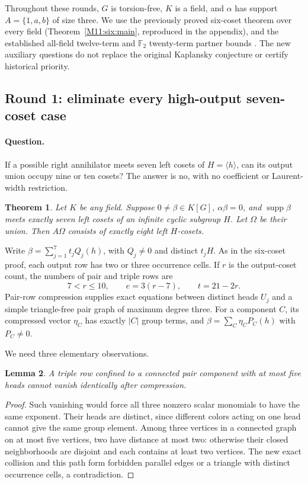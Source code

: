 \documentclass[11pt,a4paper,oneside]{report}
\newtheorem{theorem}{Theorem}[section]
\newtheorem{lemma}[theorem]{Lemma}
\theoremstyle{definition}
\theoremstyle{remark}
\DeclareMathOperator{\supp}{supp}
\begin{document}
Throughout these rounds, $G$ is torsion-free, $K$ is a field, and
$\alpha$ has support $A=\{1,a,b\}$ of size three. We use the previously
proved six-coset theorem over every field
(Theorem~\ref{M11:six:main}, reproduced in the appendix), and the established
all-field twelve-term and $\mathbb F_2$ twenty-term partner bounds
\cite{B:AJ,B:ATsmall}. The new auxiliary questions do not replace the original
Kaplansky conjecture or certify historical priority.

\subsection{Round 1: eliminate every high-output seven-coset case}

\paragraph{Question.}
If a possible right annihilator meets seven left cosets of
$H=\langle h\rangle$, can its output union occupy nine or ten cosets?
The answer is no, with no coefficient or Laurent-width restriction.

\begin{theorem}\label{M12:frontier:seven-output}
Let $K$ be any field. Suppose $0\ne\beta\in K[G]$, $\alpha\beta=0$,
and $\supp\beta$ meets exactly seven left cosets of an infinite cyclic
subgroup $H$. Let $\Omega$ be their union. Then $A\Omega$ consists
of exactly eight left $H$-cosets.
\end{theorem}

Write $\beta=\sum_{j=1}^7 t_jQ_j(h)$, with $Q_j\ne0$ and distinct
$t_jH$. As in the six-coset proof, each output row has two or three
occurrence cells. If $r$ is the output-coset count, the numbers of
pair and triple rows are
\begin{equation}\label{M12:frontier:row-counts}
 7<r\le10,\qquad e=3(r-7),\qquad t=21-2r.
\end{equation}
Pair-row compression supplies exact equations between distinct heads
$U_j$ and a simple triangle-free pair graph of maximum degree three.
For a component $C$, its compressed vector $\eta_C$ has exactly
$|C|$ group terms, and $\beta=\sum_C\eta_CP_C(h)$ with $P_C\ne0$.

We need three elementary observations.

\begin{lemma}\label{M12:frontier:five-heads}
A triple row confined to a connected pair component with at most five
heads cannot vanish identically after compression.
\end{lemma}
\begin{proof}
Such vanishing would force all three nonzero scalar monomials to have
the same exponent. Their heads are distinct, since different colors
acting on one head cannot give the same group element. Among three
vertices in a connected graph on at most five vertices, two have
distance at most two: otherwise their closed neighborhoods are
disjoint and each contains at least two vertices. The new exact
collision and this path form forbidden parallel edges or a triangle
with distinct occurrence cells, a contradiction.
\end{proof}
\end{document}
